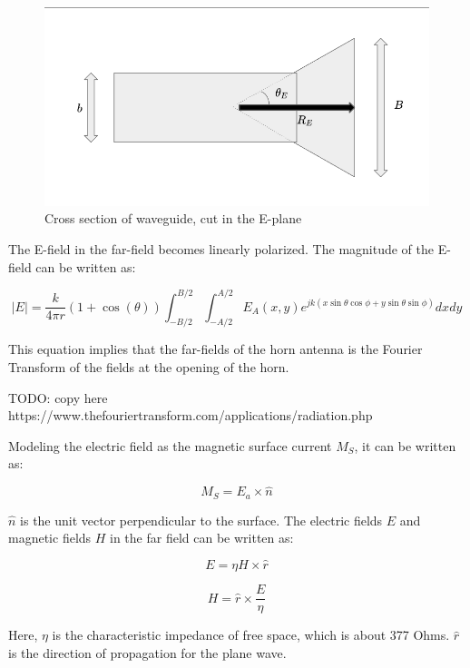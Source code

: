 \documentclass[a4paper,12pt]{report}
\begin{document}
\begin{figure}
  \begin{center}
    \includegraphics[clip, keepaspectratio, width=0.5\linewidth]{img/horn_antenna_e_plane_cross_section.png}
    \caption{Cross section of waveguide, cut in the E-plane}
    \label{fig:horn_antenna_e_plane_cross_section}
  \end{center}
\end{figure}

The E-field in the far-field becomes linearly polarized.
The magnitude of the E-field can be written as:

\begin{equation}
  |E| = \frac{k}{4 \pi r}(1 + \cos(\theta))\int_{-B/2}^{B/2}\int_{-A/2}^{A/2}E_A(x,y)e^{jk(x\sin\theta\cos\phi + y\sin\theta\sin\phi)}dxdy
\end{equation}

This equation implies that the far-fields of the horn antenna
is the Fourier Transform of the fields at the opening of the horn.

TODO: copy here https://www.thefouriertransform.com/applications/radiation.php

Modeling the electric field as the magnetic surface current $M_S$,
it can be written as:

\begin{equation}
  M_S = E_a \times \hat{n}
\end{equation}

$\hat{n}$ is the unit vector perpendicular to the surface.
The electric fields $E$ and magnetic fields $H$ in the far field can be written as:

\begin{equation}
  E = \eta H \times \hat{r}
\end{equation}

\begin{equation}
  H = \hat{r} \times \frac{E}{\eta}
\end{equation}

Here, $\eta$ is the characteristic impedance of free space,
which is about 377 Ohms. $\hat{r}$ is the direction of propagation for the plane wave.
\end{document}
